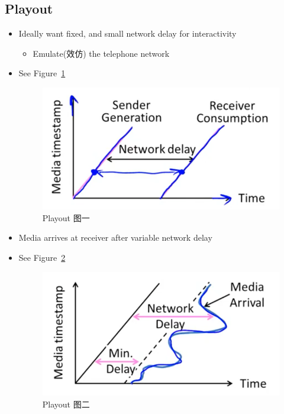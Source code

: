 \documentclass[12pt]{ctexart}   %
\begin{document}
	\subsection{Playout}
	\begin{itemize}
		\item Ideally want fixed, and small network delay for interactivity
		\begin{itemize}
			\item Emulate(效仿) the telephone network
		\end{itemize}
		\item See Figure~\ref{fig:9-2-4}
		  
		 \begin{figure}[h!] %
		\centering
		 \includegraphics[scale=0.7]{images/9-2-4}
		\caption{ Playout 图一 }
		 \label{fig:9-2-4}
		 \end{figure}
		 
		 \item Media arrives at receiver after variable network delay
		 \item See Figure~\ref{fig:9-2-5}
		  
		 \begin{figure}[h!] %
		\centering
		 \includegraphics[scale=0.7]{images/9-2-5}
		\caption{ Playout 图二 }
		 \label{fig:9-2-5}
		 \end{figure}
	\end{itemize}
	
\end{document}
